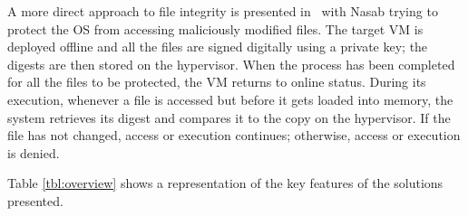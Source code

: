 \par A more direct approach to file integrity is presented in~\cite{nasab2012security} with Nasab trying to protect the \ac{OS} from accessing maliciously modified files. The target \ac{VM} is deployed offline and all the files are signed digitally using a private key; the digests are then stored on the hypervisor. When the process has been completed for all the files to be protected, the \ac{VM} returns to online status. During its execution, whenever a file is accessed but before it gets loaded into memory, the system retrieves its digest and compares it to the copy on the hypervisor. If the file has not changed, access or execution continues; otherwise, access or execution is denied.

\par Table \ref{tbl:overview} shows a representation of the key features of the solutions presented.

